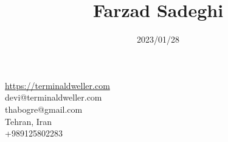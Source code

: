 \documentclass[8pt]{article}
\title{\bfseries Farzad Sadeghi}
\date{2023/01/28}
\begin{document}
\begin{multicols}{2}
  \maketitle
  \begin{center}
    \begin{minipage}[ht]{0.3\textwidth}{\centering}
      \vspace*{\fill}
      \centering
      {\href {https://terminaldweller.com} {https://terminaldweller.com}}\\
      devi@terminaldweller.com\\
      thabogre@gmail.com\\
      Tehran, Iran\\
      +989125802283
      \centering
      \vspace*{\fill}
    \end{minipage}
  \end{center}


\end{multicols}
\end{document}
